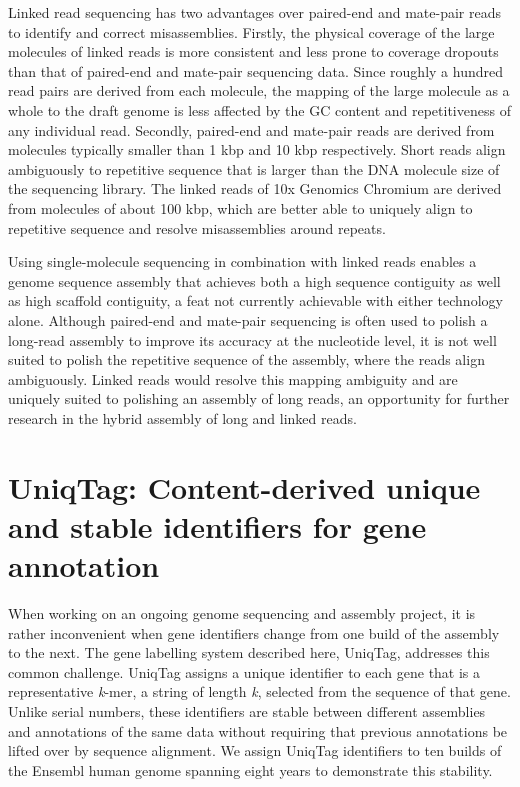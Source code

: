 \documentclass[
  12pt,
  oneside,
  openany]{book}
\begin{document}
Linked read sequencing has two advantages over paired-end and mate-pair reads to identify and correct misassemblies. Firstly, the physical coverage of the large molecules of linked reads is more consistent and less prone to coverage dropouts than that of paired-end and mate-pair sequencing data. Since roughly a hundred read pairs are derived from each molecule, the mapping of the large molecule as a whole to the draft genome is less affected by the GC content and repetitiveness of any individual read. Secondly, paired-end and mate-pair reads are derived from molecules typically smaller than 1 kbp and 10 kbp respectively. Short reads align ambiguously to repetitive sequence that is larger than the DNA molecule size of the sequencing library. The linked reads of 10x Genomics Chromium are derived from molecules of about 100 kbp, which are better able to uniquely align to repetitive sequence and resolve misassemblies around repeats.

Using single-molecule sequencing in combination with linked reads enables a genome sequence assembly that achieves both a high sequence contiguity as well as high scaffold contiguity, a feat not currently achievable with either technology alone. Although paired-end and mate-pair sequencing is often used to polish a long-read assembly to improve its accuracy at the nucleotide level, it is not well suited to polish the repetitive sequence of the assembly, where the reads align ambiguously. Linked reads would resolve this mapping ambiguity and are uniquely suited to polishing an assembly of long reads, an opportunity for further research in the hybrid assembly of long and linked reads.

\hypertarget{uniqtag-content-derived-unique-and-stable-identifiers-for-gene-annotation}{%
\chapter{UniqTag: Content-derived unique and stable identifiers for gene annotation}\label{uniqtag-content-derived-unique-and-stable-identifiers-for-gene-annotation}}


When working on an ongoing genome sequencing and assembly project, it is rather inconvenient when gene identifiers change from one build of the assembly to the next. The gene labelling system described here, UniqTag, addresses this common challenge. UniqTag assigns a unique identifier to each gene that is a representative \emph{k}-mer, a string of length \emph{k}, selected from the sequence of that gene. Unlike serial numbers, these identifiers are stable between different assemblies and annotations of the same data without requiring that previous annotations be lifted over by sequence alignment. We assign UniqTag identifiers to ten builds of the Ensembl human genome spanning eight years to demonstrate this stability.
\end{document}
